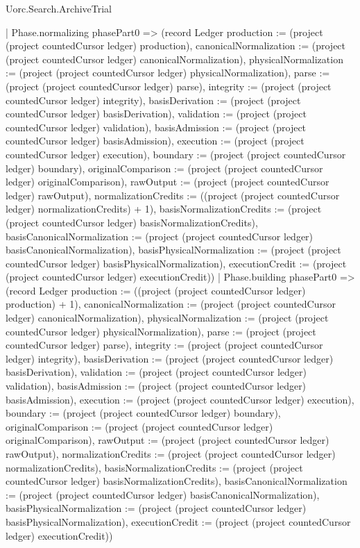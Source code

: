\begin{lexlean}{Uorc.Search.ArchiveTrial}
\begin{semanticmodule}
{{      | Phase.normalizing phasePart0 => (record Ledger {production := (project (project countedCursor ledger) production), canonicalNormalization := (project (project countedCursor ledger) canonicalNormalization), physicalNormalization := (project (project countedCursor ledger) physicalNormalization), parse := (project (project countedCursor ledger) parse), integrity := (project (project countedCursor ledger) integrity), basisDerivation := (project (project countedCursor ledger) basisDerivation), validation := (project (project countedCursor ledger) validation), basisAdmission := (project (project countedCursor ledger) basisAdmission), execution := (project (project countedCursor ledger) execution), boundary := (project (project countedCursor ledger) boundary), originalComparison := (project (project countedCursor ledger) originalComparison), rawOutput := (project (project countedCursor ledger) rawOutput), normalizationCredits := ((project (project countedCursor ledger) normalizationCredits) + 1), basisNormalizationCredits := (project (project countedCursor ledger) basisNormalizationCredits), basisCanonicalNormalization := (project (project countedCursor ledger) basisCanonicalNormalization), basisPhysicalNormalization := (project (project countedCursor ledger) basisPhysicalNormalization), executionCredit := (project (project countedCursor ledger) executionCredit)})
      | Phase.building phasePart0 => (record Ledger {production := ((project (project countedCursor ledger) production) + 1), canonicalNormalization := (project (project countedCursor ledger) canonicalNormalization), physicalNormalization := (project (project countedCursor ledger) physicalNormalization), parse := (project (project countedCursor ledger) parse), integrity := (project (project countedCursor ledger) integrity), basisDerivation := (project (project countedCursor ledger) basisDerivation), validation := (project (project countedCursor ledger) validation), basisAdmission := (project (project countedCursor ledger) basisAdmission), execution := (project (project countedCursor ledger) execution), boundary := (project (project countedCursor ledger) boundary), originalComparison := (project (project countedCursor ledger) originalComparison), rawOutput := (project (project countedCursor ledger) rawOutput), normalizationCredits := (project (project countedCursor ledger) normalizationCredits), basisNormalizationCredits := (project (project countedCursor ledger) basisNormalizationCredits), basisCanonicalNormalization := (project (project countedCursor ledger) basisCanonicalNormalization), basisPhysicalNormalization := (project (project countedCursor ledger) basisPhysicalNormalization), executionCredit := (project (project countedCursor ledger) executionCredit)})
}}
\end{semanticmodule}
\end{lexlean}
